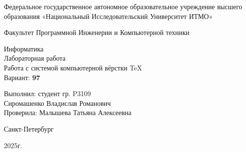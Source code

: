 \thispagestyle{empty}
\begin{center}
	Федеральное государственное автономное образовательное учреждение высшего образования «Национальный Исследовательский Университет ИТМО»
	
	\vspace{1em}
	Факультет Программной Инженерии и Компьютерной техники
	
	\vspace{20em}
	
	{\Large Информатика}\\[1em]
	{\Large Лабораторная работа }\\[1em]
	{\Large Работа с системой компьютерной вёрстки \TeX}\\[1em]
	Вариант: \textbf{97}
\end{center}

\vspace{12em}

\begin{flushright}
	Выполнил:
	студент гр. P3109\\
	Сиромашенко Владислав Романович\\
	Проверила:
	Малышева Татьяна Алексеевна
\end{flushright}
\vspace{9em}
\vspace{\fill}

\begin{center}
	Санкт-Петербург
	
	2025г.
\end{center}